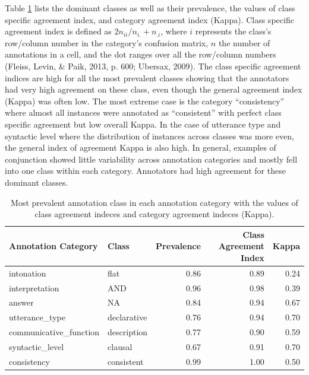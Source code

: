 \documentclass[floatsintext,man]{apa6}
\theoremstyle{definition}
\theoremstyle{definition}
\theoremstyle{definition}
\theoremstyle{remark}
\begin{document}
Table \ref{tab:andAgreeStats} lists the dominant classes as well as
their prevalence, the values of class specific agreement index, and
category agreement index (Kappa). Class specific agreement index is
defined as \(2n_{ii}/n_{i.}+n_{.i}\), where \(i\) represents the class's
row/column number in the category's confusion matrix, \(n\) the number
of annotations in a cell, and the dot ranges over all the row/column
numbers (Fleiss, Levin, \& Paik, 2013, p. 600; Ubersax, 2009). The class
specific agreement indices are high for all the most prevalent classes
showing that the annotators had very high agreement on these class, even
though the general agreement index (Kappa) was often low. The most
extreme case is the category \enquote{consistency} where almost all
instances were annotated as \enquote{consistent} with perfect class
specific agreement but low overall Kappa. In the case of utterance type
and syntactic level where the distribution of instances across classes
was more even, the general index of agreement Kappa is also high. In
general, examples of conjunction showed little variability across
annotation categories and mostly fell into one class within each
category. Annotators had high agreement for these dominant classes.

\begin{table}

\caption{\label{tab:andAgreeStats}Most prevalent annotation class in each annotation category with the values of class agreement indeces and category agreement indeces (Kappa).}
\centering
\begin{tabular}[t]{l|l|r|r|r}
\hline
Annotation Category & Class & Prevalence & Class Agreement Index & Kappa\\
\hline
intonation & flat & 0.86 & 0.89 & 0.24\\
\hline
interpretation & AND & 0.96 & 0.98 & 0.39\\
\hline
answer & NA & 0.84 & 0.94 & 0.67\\
\hline
utterance\_type & declarative & 0.76 & 0.94 & 0.70\\
\hline
communicative\_function & description & 0.77 & 0.90 & 0.59\\
\hline
syntactic\_level & clausal & 0.67 & 0.91 & 0.70\\
\hline
consistency & consistent & 0.99 & 1.00 & 0.50\\
\hline
\end{tabular}
\end{table}

\setlength{\parindent}{-0.5in} \setlength{\leftskip}{0.5in}
\end{document}

